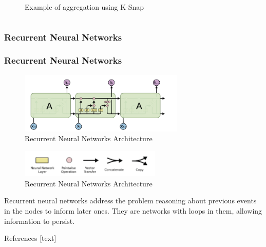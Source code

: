 \documentclass{beamer}
\numberwithin{figure}{section}
\numberwithin{equation}{section}
\begin{document}
\begin{frame}
\begin{columns}[c]
\begin{figure}[p]
  		\caption{\tiny Example of aggregation using K-Snap}
  		\label{fig:ksnap}
 	\end{figure}
  
 \end{columns}
 
 
 
 
\end{frame}

\subsubsection{Recurrent Neural Networks}
\begin{frame}\justifying \scriptsize
 \frametitle{Recurrent Neural Networks}
 	\begin{figure}[p]
  		\centering
  		\includegraphics[width=0.7\textwidth]{pictures/RNN}
  		\caption{\tiny Recurrent Neural Networks Architecture}
  		\label{fig:feacture_extraction}
 	\end{figure}
    \begin{figure}[p]
  		\centering
  		\includegraphics[width=0.6\textwidth]{pictures/leyendarnn}
  		\caption{\tiny Recurrent Neural Networks Architecture}
  		\label{fig:feacture_extraction}
 	\end{figure}
    
    \scriptsize Recurrent neural networks address the problem reasoning about previous events in the nodes to inform later ones. They are networks with loops in them, allowing information to persist\cite{Jozefowicz2015}.
\end{frame}


\begin{frame}[allowframebreaks]{References} \justify \tiny
 [text]
 
 {}
\end{frame}


\ThankYouFrame

\end{document}
